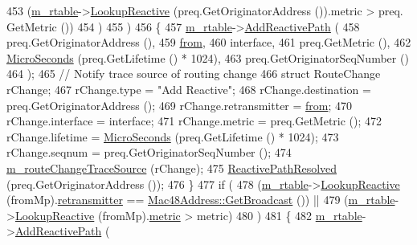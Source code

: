 \begin{DoxyCode}
453       (\hyperlink{classns3_1_1dot11s_1_1HwmpProtocol_a12fda0e3e5a400888c8ba1a87c1a7216}{m\_rtable}->\hyperlink{classns3_1_1dot11s_1_1HwmpRtable_a41a44ed94c1ed4d798f3278ba8db0f1f}{LookupReactive} (preq.GetOriginatorAddress ()).metric > preq.
      GetMetric ())
454     )
455     )
456     \{
457       \hyperlink{classns3_1_1dot11s_1_1HwmpProtocol_a12fda0e3e5a400888c8ba1a87c1a7216}{m\_rtable}->\hyperlink{classns3_1_1dot11s_1_1HwmpRtable_af764d62637a7c567706f4fa0cc09c51d}{AddReactivePath} (
458         preq.GetOriginatorAddress (),
459         \hyperlink{lte__amc_8m_a1b4c81ff74eb1a626b5ade44c81004b3}{from},
460         interface,
461         preq.GetMetric (),
462         \hyperlink{group__timecivil_ga17465a639c8d1464e76538afdd78a9f0}{MicroSeconds} (preq.GetLifetime () * 1024),
463         preq.GetOriginatorSeqNumber ()
464         );
465       \textcolor{comment}{// Notify trace source of routing change}
466       \textcolor{keyword}{struct }RouteChange rChange;
467       rChange.type = \textcolor{stringliteral}{"Add Reactive"};
468       rChange.destination = preq.GetOriginatorAddress ();
469       rChange.retransmitter = \hyperlink{lte__amc_8m_a1b4c81ff74eb1a626b5ade44c81004b3}{from};
470       rChange.interface = interface;
471       rChange.metric = preq.GetMetric ();
472       rChange.lifetime = \hyperlink{group__timecivil_ga17465a639c8d1464e76538afdd78a9f0}{MicroSeconds} (preq.GetLifetime () * 1024);
473       rChange.seqnum = preq.GetOriginatorSeqNumber ();
474       \hyperlink{classns3_1_1dot11s_1_1HwmpProtocol_aff5ca87b57430809a6b6ee25fa526948}{m\_routeChangeTraceSource} (rChange);
475       \hyperlink{classns3_1_1dot11s_1_1HwmpProtocol_ac9ee2097883725cf40dd05537e12a9eb}{ReactivePathResolved} (preq.GetOriginatorAddress ());
476     \}
477   \textcolor{keywordflow}{if} (
478     (\hyperlink{classns3_1_1dot11s_1_1HwmpProtocol_a12fda0e3e5a400888c8ba1a87c1a7216}{m\_rtable}->\hyperlink{classns3_1_1dot11s_1_1HwmpRtable_a41a44ed94c1ed4d798f3278ba8db0f1f}{LookupReactive} (fromMp).\hyperlink{structns3_1_1dot11s_1_1HwmpRtable_1_1LookupResult_ae18d2b84b512a78e57308e11ffab0a38}{retransmitter} == 
      \hyperlink{classns3_1_1Mac48Address_a55156e302c6bf950c0b558365adbde84}{Mac48Address::GetBroadcast} ()) ||
479     (\hyperlink{classns3_1_1dot11s_1_1HwmpProtocol_a12fda0e3e5a400888c8ba1a87c1a7216}{m\_rtable}->\hyperlink{classns3_1_1dot11s_1_1HwmpRtable_a41a44ed94c1ed4d798f3278ba8db0f1f}{LookupReactive} (fromMp).\hyperlink{structns3_1_1dot11s_1_1HwmpRtable_1_1LookupResult_a4f284164803a0896f2dbafdd57fb777b}{metric} > metric)
480     )
481     \{
482       \hyperlink{classns3_1_1dot11s_1_1HwmpProtocol_a12fda0e3e5a400888c8ba1a87c1a7216}{m\_rtable}->\hyperlink{classns3_1_1dot11s_1_1HwmpRtable_af764d62637a7c567706f4fa0cc09c51d}{AddReactivePath} (

\end{DoxyCode}
